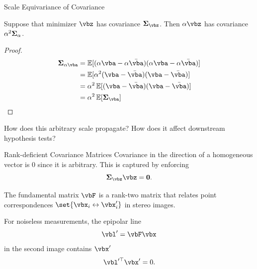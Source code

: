 \documentclass[8pt,aspectratio=169]{beamer}
\begin{document}
\begin{frame}{Scale Equivariance of Covariance}
  \begin{lemma}
    Suppose that minimizer $\vbz$ has covariance $\vbSigma_{\vbz}$.
    Then $\alpha \vbz$ has covariance $\alpha^2 \bm{\Sigma}_{\alpha}$.
  \end{lemma}
  \begin{proof}
  \[
    \begin{split}
      \vbSigma_{\alpha\vba} &= \EE\brackets{(\alpha\vba-\alpha\bar{\vba})(\alpha\vba-\alpha\bar{\vba})} \\
                            &= \EE\brackets{ \alpha^2(\vba-\bar{\vba})(\vba-\bar{\vba})} \\
                            &= \alpha^2 \EE\brackets{ (\vba-\bar{\vba})(\vba-\bar{\vba}) } \\
                            &= \alpha^2\EE\brackets{\vbSigma_{\vba}}
    \end{split}
  \]
\end{proof}

\begin{remark}
  How does this arbitrary scale propagate? How does it affect downstream hypothesis tests?
\end{remark}
\end{frame}

\begin{frame}{Rank-deficient Covariance Matrices}
  Covariance in the direction of a homogeneous vector is 0 since 
  it is arbitrary. This is captured by enforcing
  \[
    \vbSigma_{\vbz}\vbz = \vbzero.
  \]
\end{frame}
  
%
%

\begin{frame}
  \begin{remark}
    The fundamental matrix $\vbF$ is a rank-two matrix that relates
    point correspondences $\set{\cspond{\vbx_i}{\vbx'_i}}$ in
    stereo images.
  \end{remark}
  
  \smallskip
  
  For noiseless measurements, the epipolar line
  \[
    \vbl' = \vbF\vbx
  \]
  in the second image contains $\vbx'$
  \[
    \vbl'^{\T}\vbx' = 0.
  \]
\end{frame}
\end{document}
